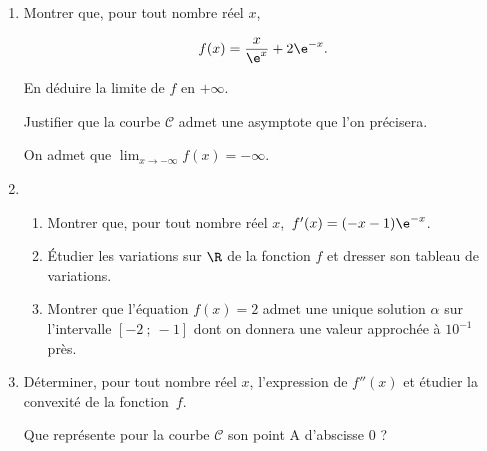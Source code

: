 \medskip

\begin{enumerate}
\item Montrer que, pour tout nombre réel $x$,

\[f(x) = \dfrac{x}{\e^{x}}+ 2\e^{-x}.\]

En déduire la limite de $f$ en $+ \infty$.

Justifier que la courbe $\mathcal{C}$ admet une asymptote que l'on précisera.

On admet que $\displaystyle\lim_{x \to - \infty} f(x) = - \infty$.
\item 
	\begin{enumerate}
		\item Montrer que, pour tout nombre réel $x$,\, $f'(x) = (- x - 1)\e^{-x}$.
		\item Étudier les variations sur $\R$ de la fonction $f$ et dresser son tableau de variations.
		\item Montrer que l'équation $f(x) = 2$ admet une unique solution $\alpha$ sur l'intervalle $[-2~;~-1]$ dont on donnera une valeur approchée à $10^{-1}$ près.
	\end{enumerate}
\item Déterminer, pour tout nombre réel $x$, l'expression de $f''(x)$ et étudier la convexité de la fonction~$f$. 

Que représente pour la courbe $\mathcal{C}$ son point A d'abscisse $0$ ?
\end{enumerate}
